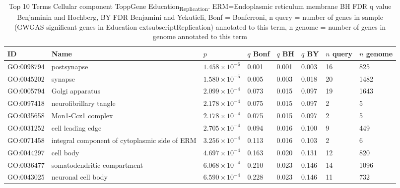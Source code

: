 \begin{table}[ht]
\centering
 \setlength{\extrarowheight}{2pt}
\begin{adjustbox}{width=\textwidth}
\begin{tabular}{llllllll}
  \toprule
ID & Name & $p$ & $q$ Bonf & $q$ BH & $q$ BY & $n$ query & $n$ genome \\ 
  \midrule
GO:0098794 & postsynapse & $1.458 \times 10^{-6}$ & 0.001 & 0.001 & 0.003 & 16 & 825 \\ 
  GO:0045202 & synapse & $1.580 \times 10^{-5}$ & 0.005 & 0.003 & 0.018 & 20 & 1482 \\ 
  GO:0005794 & Golgi apparatus & $2.099 \times 10^{-4}$ & 0.073 & 0.015 & 0.097 & 19 & 1643 \\ 
  GO:0097418 & neurofibrillary tangle & $2.178 \times 10^{-4}$ & 0.075 & 0.015 & 0.097 & 2 & 5 \\ 
  GO:0035658 & Mon1-Ccz1 complex & $2.178 \times 10^{-4}$ & 0.075 & 0.015 & 0.097 & 2 & 5 \\ 
  GO:0031252 & cell leading edge & $2.705 \times 10^{-4}$ & 0.094 & 0.016 & 0.100 & 9 & 449 \\ 
  GO:0071458 & integral component of cytoplasmic side of ERM & $3.256 \times 10^{-4}$ & 0.113 & 0.016 & 0.103 & 2 & 6 \\ 
  GO:0044297 & cell body & $4.697 \times 10^{-4}$ & 0.163 & 0.020 & 0.131 & 12 & 820 \\ 
  GO:0036477 & somatodendritic compartment & $6.068 \times 10^{-4}$ & 0.210 & 0.023 & 0.146 & 14 & 1096 \\ 
  GO:0043025 & neuronal cell body & $6.590 \times 10^{-4}$ & 0.228 & 0.023 & 0.146 & 11 & 732 \\ 
   \bottomrule
\end{tabular}
\end{adjustbox}
\caption{ Top 10 Terms Cellular component ToppGene Education\textsubscript{Replication}. ERM=Endoplasmic reticulum membrane BH FDR q value Benjaminin and Hochberg, BY FDR Benjamini and Yekutieli, Bonf = Bonferroni, n query = number of genes in sample (GWGAS significant genes in Education	extsubscript{Replication}) annotated to this term, n genome = number of genes in genome annotated to this term} 
\label{tab:CC EA2 all significant toppgene}
\end{table}


